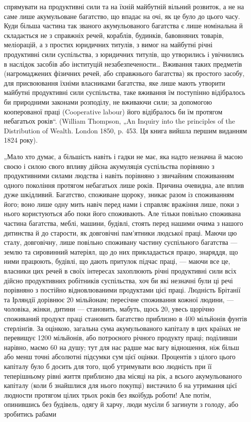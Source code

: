 \parcont{}  %
спрямувати на продуктивні сили та на їхній майбутній вільний розвиток,
а не на саме лише акумульоване багатство, що впадає на очі, як це
було до цього часу. Куди більша частина так званого акумульованого
багатства є лише номінальна й складається не з справжніх речей, кораблів,
будинків, бавовняних товарів, меліорацій, а з простих юридичних
титулів, з вимог на майбутні річні продуктивні сили суспільства, з юридичних
титулів, що утворились і увічнились в наслідок засобів або
інституцій незабезпечености\dots{} Вживання таких предметів (нагромаджених
фізичних речей, або справжнього багатства) як простого
засобу, для присвоювання їхніми власниками багатства, яке лише мають
утворити майбутні продуктивні сили суспільства, таке вживання їм поступінно
відібралось би природними законами розподілу, не вживаючи
сили; за допомогою кооперованої праці (Cooperative labour) його
відібралось би їм протягом небагатьох років“. (William Thompson, „An
Inquiry into the principles of the Distribution of Wealth. London 1850, p. 453.
Ця книга вийшла першим виданням 1824 року).

„Мало хто думає, а більшість навіть і гадки не має, яка надто
незначна й масою своєю і силою свого впливу дійсна акумуляція суспільства
порівняно з продуктивними силами людства і навіть порівняно
з звичайним споживанням одного покоління протягом небагатьох лише
років. Причина очевидна, але вплив дуже шкідливий. Багатство, споживане
щороку, зникає разом із споживанням його; воно лише одну мить
навіч перед нами і справляє вражіння лише, поки з нього користуються
або поки його споживають. Але тільки повільно споживана частина
багатства, меблі, машини, будівлі, стоять перед нашими очима з нашого
дитинства й до старости, як довговічні пам’ятники людської праці.
Маючи цю сталу, довговічну, лише повільно споживану частину суспільного
багатства — землю та сировинний матеріял, що до них прикладається
працю, знаряддя, що ними працюють, будівлі, що дають притулок підчас
праці, — маючи все це, власники цих речей в своїх інтересах захоплюють
річні продуктивні сили всіх дійсно продуктивних робітників суспільства,
хоч би які незначні були ці речі порівняно з постійно відновлюваними
продуктами цієї праці. Людність Брітанії та Ірляндії дорівнює 20 мільйонам;
пересічне споживання кожної людини, — чоловіка, жінки, дитини —
становить, мабуть, щось 20, увесь щорічно споживаний продукт
праці становить багатство приблизно в 400 мільйонів фунтів стерлінґів. За оцінкою,
загальна сума акумульованого капіталу в цих країнах не перевищує
1200 мільйонів, або потроєного річного продукту праці; поділивши
нарівно, маємо 60 на душу; тут для нас радше має вагу відношення,
ніж більш або менш точні абсолютні підсумки сум цієї оцінки.
Процентів з цілого цього капіталу було б досить для того, щоб утримувати
всю людність при її теперішньому рівні життя приблизно два
місяці на рік, а всього акумульованого капіталу (коли б знайшлися для
нього покупці) вистачило б на утримання цієї людности протягом цілих
трьох років без якоїбудь роботи! Але потім, опинившись без будівель,
одягу й харчу, люди мусіли б загинути з голоду, або зробитись рабами
\parbreak{}  %
